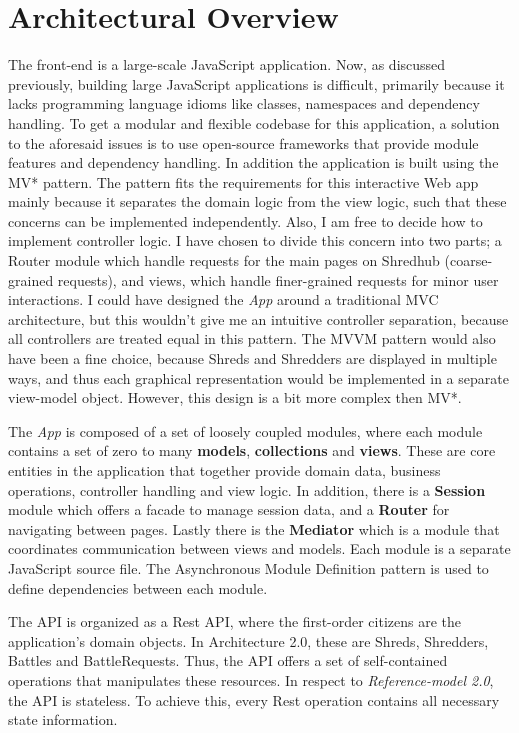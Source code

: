 \section{Architectural Overview}
The front-end is a large-scale JavaScript application. Now, as discussed previously, building large JavaScript applications is difficult, primarily because it lacks programming language idioms like classes, namespaces and dependency handling. To get a modular and flexible codebase for this application, a solution to the aforesaid issues is to use open-source frameworks that provide module features and dependency handling. In addition the application is built using the MV* pattern. The pattern fits the requirements for this interactive Web app mainly because it separates the domain logic from the view logic, such that these concerns can be implemented independently. Also, I am free to decide how to implement controller logic. I have chosen to divide this concern into two parts; a Router module which handle requests for the main pages on Shredhub (coarse-grained requests), and views, which handle finer-grained requests for minor user interactions. I could have designed the \textit{App} around a traditional MVC architecture, but this wouldn't give me an intuitive controller separation, because all controllers are treated equal in this pattern. The MVVM pattern would also have been a fine choice, because Shreds and Shredders are displayed in multiple ways, and thus each graphical representation would be implemented in a separate view-model object. However, this design is a bit more complex then MV*.

The \textit{App} is composed of a set of loosely coupled modules, where each module contains a set of zero to many \textbf{models}, \textbf{collections} and \textbf{views}. These are core entities in the application that together provide domain data, business operations, controller handling and view logic. In addition, there is a \textbf{Session} module which offers a facade to manage session data, and a \textbf{Router} for navigating between pages. Lastly there is the  \textbf{Mediator} which is a module that coordinates communication between views and models. Each module is a separate JavaScript source file. The Asynchronous Module Definition pattern is used to define dependencies between each module. 

The API is organized as a Rest API\cite{rest}, where the first-order citizens are the application's domain objects. In Architecture 2.0, these are Shreds, Shredders, Battles and BattleRequests. Thus, the API offers a set of self-contained operations that manipulates these resources. In respect to \textit{Reference-model 2.0}, the API is stateless. To achieve this, every Rest operation contains all necessary state information. 

